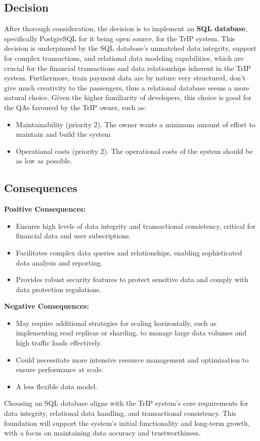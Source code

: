 \subsection*{Decision}
After thorough consideration, the decision is to implement an \textbf{SQL database}, specifically PostgreSQL for it being open source, for the TrIP system. This decision is underpinned by the SQL database's unmatched data integrity, support for complex transactions, and relational data modeling capabilities, which are crucial for the financial transactions and data relationships inherent in the TrIP system. Furthermore, train payment data are by nature very structured, don't give much creativity to the passengers, thus a relational database seems a more natural choice. Given the higher familiarity of developers, this choice is good for the QAs favoured by the TrIP owner, such as:
\begin{itemize}
    \item Maintainability (priority 2). The owner wants a minimum amount of effort to maintain and build the system
    \item Operational costs (priority 2). The operational costs of the system should be as low as possible.
\end{itemize}

\subsection*{Consequences}
\textbf{Positive Consequences:}
\begin{itemize}
    \item Ensures high levels of data integrity and transactional consistency, critical for financial data and user subscriptions.
    \item Facilitates complex data queries and relationships, enabling sophisticated data analysis and reporting.
    \item Provides robust security features to protect sensitive data and comply with data protection regulations.
\end{itemize}
\textbf{Negative Consequences:}
\begin{itemize}
    \item May require additional strategies for scaling horizontally, such as implementing read replicas or sharding, to manage large data volumes and high traffic loads effectively.
    \item Could necessitate more intensive resource management and optimization to ensure performance at scale.
    \item A less flexible data model.
\end{itemize}
Choosing an SQL database aligns with the TrIP system's core requirements for data integrity, relational data handling, and transactional consistency. This foundation will support the system's initial functionality and long-term growth, with a focus on maintaining data accuracy and trustworthiness.